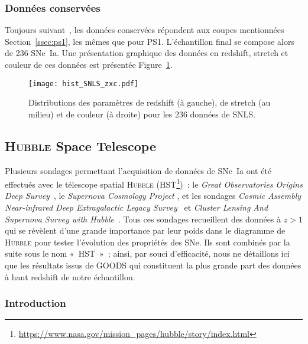 \documentclass[../main/main.tex]{subfiles}
\begin{document}
\subsubsection{Données conservées}\label{ssec:snlsdata}

Toujours suivant~\cite{scolnic2018}, les données conservées répondent aux coupes
mentionnées Section~\ref{ssec:ps1}, les mêmes que pour PS1. L'échantillon final
se compose alors de 236 SNe~Ia. Une présentation graphique des données en
redshift, stretch et couleur de ces données est présentée
Figure~\ref{fig:snlshist}.

\begin{figure}[h]
    \centering
    \texttt{[image: hist\_SNLS\_zxc.pdf]}
    \captionsetup{justification=centering}
    \caption{Distributions des paramètres de redshift (à gauche), de stretch (au
    milieu) et de couleur (à droite) pour les 236 données de SNLS.}
    \label{fig:snlshist}
\end{figure}

\subsection{\textsc{Hubble} Space Telescope}\label{ssec:hst}

Plusieurs sondages permettant l'acquisition de données de SNe~Ia ont été
effectués avec le télescope spatial \textsc{Hubble}
(HST\footnote{\href{https://www.nasa.gov/mission_pages/hubble/story/index.html}
{https://www.nasa.gov/mission\_pages/hubble/story/index.html}})~: le
\textit{Great Observatories Origins Deep
Survey}~\citep[GOODS,][]{giavalisco2004, strolger2004, riess2007}, le
\textit{Supernova Cosmology Project} \citep[SCP,][]{suzuki2012}, et les sondages
\textit{Cosmic Assembly Near-infrared Deep Extragalactic Legacy
Survey}~\citep[CANDELS,][]{rodney2014} et \textit{Cluster Lensing And Supernova
Survey with Hubble}~\citep[CLASH,][]{graur2014}. Tous ces sondages recueillent
des données à $z > 1$ qui se révèlent d'une grande importance par leur poids
dans le diagramme de \textsc{Hubble} pour tester l'évolution des propriétés des
SNe. Ils sont combinés par la suite sous le nom «~HST~»~; ainsi, par souci
d'efficacité, nous ne détaillons ici que les résultats issus de GOODS qui
constituent la plus grande part des données à haut redshift de notre
échantillon.

\subsubsection{Introduction}\label{sssec:hstintro}
\end{document}
